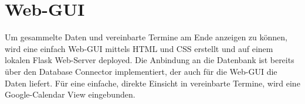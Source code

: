     
    \section{Web-GUI}
        Um gesammelte Daten und vereinbarte Termine am Ende anzeigen zu können, wird eine einfach Web-GUI mittels HTML und CSS erstellt und auf einem lokalen Flask Web-Server deployed. Die Anbindung an die Datenbank ist bereits über den Database Connector implementiert, der auch für die Web-GUI die Daten liefert. Für eine einfache, direkte Einsicht in vereinbarte Termine, wird eine Google-Calendar View eingebunden. 